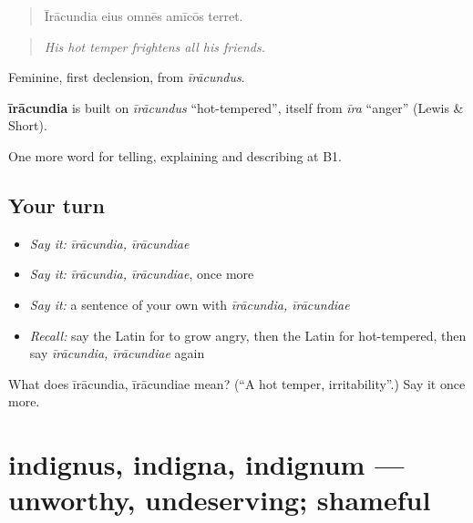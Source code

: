 \begin{quote}
Īrācundia eius omnēs amīcōs terret.
\end{quote}

\begin{quote}
\emph{His hot temper frightens all his friends.}
\end{quote}

Feminine, first declension, from \emph{īrācundus}.

\begin{cousinweb}
\textbf{īrācundia} is built on \emph{īrācundus} \textquotedblleft{}hot-tempered\textquotedblright{}, itself from \emph{īra} \textquotedblleft{}anger\textquotedblright{} (Lewis \& Short).
\end{cousinweb}

\begin{grammarlens}[title={What you've built}]
One more word for telling, explaining and describing at B1.
\end{grammarlens}

\subsection*{Your turn}
\begin{itemize}
\raggedright
  \item \emph{Say it:} \emph{īrācundia, īrācundiae}
  \item \emph{Say it:} \emph{īrācundia, īrācundiae}, once more
  \item \emph{Say it:} a sentence of your own with \emph{īrācundia, īrācundiae}
  \item \emph{Recall:} say the Latin for to grow angry, then the Latin for hot-tempered, then say \emph{īrācundia, īrācundiae} again
\end{itemize}

\begin{tcolorbox}[breakable,colback=teal!4,colframe=teal!35!black,title={Before you move on}]
What does īrācundia, īrācundiae mean? (\textquotedblleft{}A hot temper, irritability\textquotedblright{}.) Say it once more.
\end{tcolorbox}
\section[indignus, indigna, indignum]{indignus, indigna, indignum — unworthy, undeserving; shameful}

\label{lesson:LA-C493-indignus}



